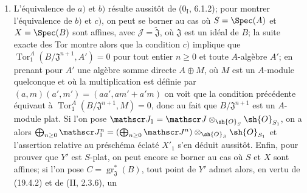 \begin{enumerate}
  \item[(i)] L'équivalence de $a)$ et $b)$ résulte aussitôt de ($0_{\mathrm I}$, 6.1.2); pour montrer l'équivalence de $b)$ et $c)$, on peut se borner au cas où $S=\Spec(A)$ et $X=\Spec(B)$ sont affines, avec $\mathscr J=\widetilde{\mathfrak J}$, où $\mathfrak J$ est un idéal de $B$; la suite exacte des Tor montre alors que la condition $c)$ implique que $\operatorname{Tor}_1^A(B/\mathfrak J^{n+1},A')=0$ pour tout entier $n\geq0$ et toute $A$-algèbre $A'$; en prenant pour $A'$ une algèbre somme directe $A\oplus M$, où $M$ est un $A$-module quelconque et où la multiplication est définie par $(a,m)(a',m')=(aa',am'+a'm)$ on voit que la condition précédente équivaut à $\operatorname{Tor}_1^A(B/\mathfrak J^{n+1},M)=0$, donc au fait que $B/\mathfrak J^{n+1}$ est un $A$-module plat. Si l'on pose $\mathscr J_1=\mathscr J\otimes_{\sh{O}_S}\sh{O}_{S_1}$, on a alors $\bigoplus_{n\geq0}\mathscr J_1^n=(\bigoplus_{n\geq0}\mathscr J^n)\otimes_{\sh{O}_S}\sh{O}_{S_1}$ et l'assertion relative au préschéma éclaté $X'_1$ s'en déduit aussitôt. Enfin, pour prouver que $Y'$ est $S$-plat, on peut encore se borner au cas où $S$ et $X$ sont affines; si l'on pose $C=\operatorname{gr}_{\mathfrak J}^*(B)$, tout point de $Y'$ admet alors, en vertu de (19.4.2) et de (II, 2.3.6), un



\end{enumerate}
